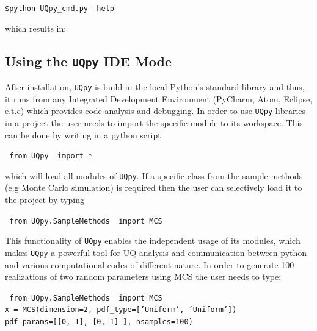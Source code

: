 \vspace{4mm}
{\centering
	{\small \texttt{\$python UQpy\_cmd.py --help}}\par}
\vspace{4mm}


\noindent
which results in:

\begin{figure}[!ht]
	\caption{}
	\label{UQpy_help}
\end{figure}


\subsection{Using the \texttt{UQpy}  IDE Mode}
\label{sec:IDE_Mode}

\noindent
After installation, \texttt{UQpy} is build in the local Python’s standard library and thus, it runs from any Integrated Development Environment (PyCharm, Atom, Eclipse, e.t.c) which provides code analysis and debugging. In order to use \texttt{UQpy} libraries in a project the user needs to import the specific module to its workspace. This can be done by writing in a python script

\vspace{4mm}
{\centering
 \texttt{{\color{blue} from} \texttt{UQpy} {\color{blue} import} * }\par}
\vspace{4mm}

\noindent
which will load all modules of \texttt{UQpy}. If a specific class from the sample methods  (e.g Monte Carlo simulation) is required then the user can selectively load it to the project by typing 
\vspace{4mm}

{\centering
 \texttt{{\color{blue} from} \texttt{UQpy.SampleMethods} {\color{blue} import} MCS }\par}

\vspace{4mm}
\noindent
This functionality of \texttt{UQpy} enables the independent usage of its  modules, which makes \texttt{UQpy} a powerful tool for UQ analysis and communication between python and various computational codes of different nature.  In order to generate 100 realizations of two random parameters using MCS  the user needs to type:
\vspace{4mm}

{\centering
	\texttt{{\color{blue} from} \texttt{UQpy.SampleMethods} {\color{blue} import} MCS }\\
	\texttt{x = MCS(dimension=2, pdf\_type=['Uniform', 'Uniform'])\\
	pdf\_params=[[0, 1], [0, 1] ], nsamples=100)}\par}

